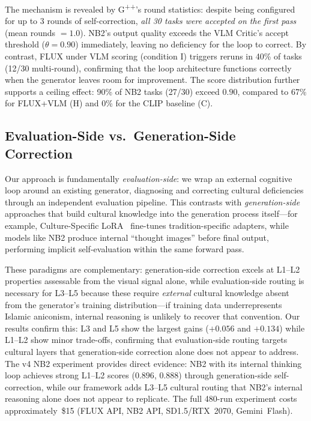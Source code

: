 \documentclass[sigconf, screen, review, anonymous]{acmart}
\newcommand{\Lx}[1]{L#1}
\begin{document}
The mechanism is revealed by G\textsuperscript{++}'s round statistics: despite being configured for up to 3 rounds of self-correction, \emph{all 30 tasks were accepted on the first pass} (mean rounds $= 1.0$).
NB2's output quality exceeds the VLM Critic's accept threshold ($\theta = 0.90$) immediately, leaving no deficiency for the loop to correct.
By contrast, FLUX under VLM scoring (condition I) triggers reruns in 40\% of tasks (12/30 multi-round), confirming that the loop architecture functions correctly when the generator leaves room for improvement.
The score distribution further supports a ceiling effect: 90\% of NB2 tasks (27/30) exceed $0.90$, compared to 67\% for FLUX+VLM (H) and 0\% for the CLIP baseline (C).

\subsection{Evaluation-Side vs.\ Generation-Side Correction}

Our approach is fundamentally \emph{evaluation-side}: we wrap an external cognitive loop around an existing generator, diagnosing and correcting cultural deficiencies through an independent evaluation pipeline.
This contrasts with \emph{generation-side} approaches that build cultural knowledge into the generation process itself---for example, Culture-Specific LoRA~\cite{chen2025culture} fine-tunes tradition-specific adapters, while models like NB2 produce internal ``thought images'' before final output, performing implicit self-evaluation within the same forward pass.

These paradigms are complementary: generation-side correction excels at \Lx{1}--\Lx{2} properties assessable from the visual signal alone, while evaluation-side routing is necessary for \Lx{3}--\Lx{5} because these require \emph{external} cultural knowledge absent from the generator's training distribution---if training data underrepresents Islamic aniconism, internal reasoning is unlikely to recover that convention.
Our results confirm this: \Lx{3} and \Lx{5} show the largest gains ($+0.056$ and $+0.134$) while \Lx{1}--\Lx{2} show minor trade-offs, confirming that evaluation-side routing targets cultural layers that generation-side correction alone does not appear to address.
The v4 NB2 experiment provides direct evidence: NB2 with its internal thinking loop achieves strong \Lx{1}--\Lx{2} scores ($0.896$, $0.888$) through generation-side self-correction, while our framework adds \Lx{3}--\Lx{5} cultural routing that NB2's internal reasoning alone does not appear to replicate.
The full 480-run experiment costs approximately~\$15 (FLUX API, NB2 API, SD1.5/RTX~2070, Gemini~Flash).
\end{document}
